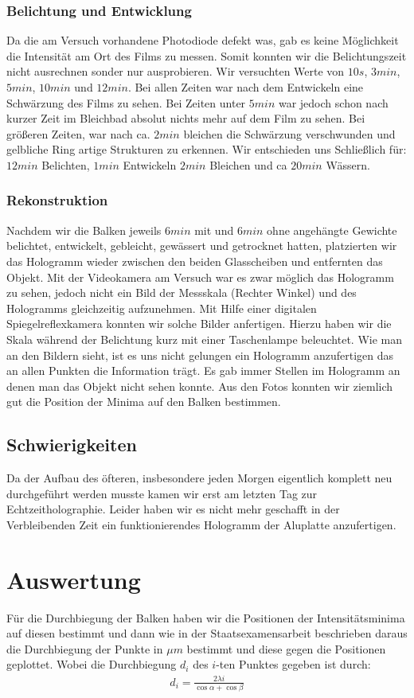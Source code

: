 \documentclass[12pt]{article}
\begin{document}
\subsubsection{Belichtung und Entwicklung}
Da die am Versuch vorhandene Photodiode defekt was, gab es keine Möglichkeit die Intensität am Ort des Films zu messen. Somit konnten wir die Belichtungszeit
nicht ausrechnen sonder nur ausprobieren. Wir versuchten Werte von $10s$, $3min$, $5min$, $10min$ und $12min$. Bei allen Zeiten war nach dem Entwickeln eine
Schwärzung des Films zu sehen. Bei Zeiten unter $5min$ war jedoch schon nach kurzer Zeit im Bleichbad absolut nichts mehr auf dem Film zu sehen. Bei größeren
Zeiten, war nach ca. $2min$ bleichen die Schwärzung verschwunden und gelbliche Ring artige Strukturen zu erkennen. Wir entschieden uns Schließlich für:
$12min$ Belichten, $1min$ Entwickeln $2min$ Bleichen und ca $20min$ Wässern.

\subsubsection{Rekonstruktion}
Nachdem wir die Balken jeweils $6min$ mit und $6min$ ohne angehängte Gewichte belichtet, entwickelt, gebleicht, gewässert und getrocknet hatten, platzierten
wir das Hologramm wieder zwischen den beiden Glasscheiben und entfernten das Objekt. Mit der Videokamera am Versuch war es zwar möglich das Hologramm zu sehen,
jedoch nicht ein Bild der Messskala (Rechter Winkel) und des Hologramms gleichzeitig aufzunehmen. Mit Hilfe einer digitalen Spiegelreflexkamera konnten wir
solche Bilder anfertigen. Hierzu haben wir die Skala während der Belichtung kurz mit einer Taschenlampe beleuchtet. Wie man an den Bildern sieht, ist es uns
nicht gelungen ein Hologramm anzufertigen das an allen Punkten die Information trägt. Es gab immer Stellen im Hologramm an denen man das Objekt nicht sehen 
konnte. Aus den Fotos konnten wir ziemlich gut die Position der Minima auf den Balken bestimmen.

\subsection{Schwierigkeiten}
Da der Aufbau des öfteren, insbesondere jeden Morgen eigentlich komplett neu durchgeführt werden musste kamen wir erst am letzten Tag zur Echtzeitholographie.
Leider haben wir es nicht mehr geschafft in der Verbleibenden Zeit ein funktionierendes Hologramm der Aluplatte anzufertigen.

\section{Auswertung}
Für die Durchbiegung der Balken haben wir die Positionen der Intensitätsminima auf diesen bestimmt und dann wie in der Staatsexamensarbeit beschrieben
daraus die Durchbiegung der Punkte in $\mu m$ bestimmt und diese gegen die Positionen geplottet. 
Wobei die Durchbiegung $d_i$ des $i$-ten Punktes gegeben ist durch:
\begin{align}
 d_i = \frac{2 \lambda i}{\cos{\alpha} + \cos{\beta}}
\end{align}
\end{document}
